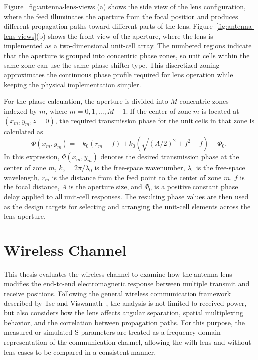 Figure~\ref{fig:antenna-lens-views}(a) shows the side view of the lens configuration, where the feed illuminates the aperture from the focal position and produces different propagation paths toward different parts of the lens. Figure~\ref{fig:antenna-lens-views}(b) shows the front view of the aperture, where the lens is implemented as a two-dimensional unit-cell array. The numbered regions indicate that the aperture is grouped into concentric phase zones, so unit cells within the same zone can use the same phase-shifter type. This discretized zoning approximates the continuous phase profile required for lens operation while keeping the physical implementation simpler.

For the phase calculation, the aperture is divided into $M$ concentric zones indexed by $m$, where $m=0,1,\ldots,M-1$. If the center of zone $m$ is located at $(x_m,y_m,z=0)$, the required transmission phase for the unit cells in that zone is calculated as
\begin{equation}
    \Phi(x_m,y_m) =
    -k_0(r_m - f)
    + k_0\left(\sqrt{(A/2)^2 + f^2} - f\right)
    + \Phi_0.
\end{equation}
In this expression, $\Phi(x_m,y_m)$ denotes the desired transmission phase at the center of zone $m$, $k_0=2\pi/\lambda_0$ is the free-space wavenumber, $\lambda_0$ is the free-space wavelength, $r_m$ is the distance from the feed point to the center of zone $m$, $f$ is the focal distance, $A$ is the aperture size, and $\Phi_0$ is a positive constant phase delay applied to all unit-cell responses. The resulting phase values are then used as the design targets for selecting and arranging the unit-cell elements across the lens aperture.

\section{Wireless Channel}
This thesis evaluates the wireless channel to examine how the antenna lens modifies the end-to-end electromagnetic response between multiple transmit and receive positions. Following the general wireless communication framework described by Tse and Viswanath~\cite{Tse2005}, the analysis is not limited to received power, but also considers how the lens affects angular separation, spatial multiplexing behavior, and the correlation between propagation paths. For this purpose, the measured or simulated S-parameters are treated as a frequency-domain representation of the communication channel, allowing the with-lens and without-lens cases to be compared in a consistent manner.

